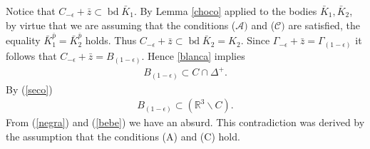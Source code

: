 \documentclass[12pt]{amsart}
\newcommand{\Rt}{\mathbb{R}^3}
\newcommand{\bd}{\operatorname*{bd}}
\begin{document}
Notice that $C_{-\epsilon}+\bar{z}\subset \bd \bar{K}_1$. 
By Lemma \ref{choco} applied to the bodies $\bar{K}_1,\bar{K}_2$, by virtue that we are assuming that the conditions ($\mathcal{A})$ and ($\mathcal{C})$ are satisfied, the equality $\bar{K}^{\bar{p}}_1=\bar{K}^{\bar{p}}_2$ holds. Thus $C_{-\epsilon}+\bar{z}\subset \bd \bar{K}_2=K_2$. Since $\Gamma_{-\epsilon}+\bar{z}=\Gamma_{(1-\epsilon)}$ it follows that $C_{-\epsilon}+\bar{z}=B_{(1-\epsilon)}$. Hence \ref{blanca} implies 
\begin{eqnarray}\label{negra}
B_{(1-\epsilon)}\subset C\cap \Delta^+.
\end{eqnarray}
By (\ref{seco}) 
\begin{eqnarray}\label{bebe}
B_{(1-\epsilon)}\subset (\Rt \backslash C).
\end{eqnarray}
From (\ref{negra}) and (\ref{bebe}) we have an absurd. This contradiction was derived by the assumption that the conditions (A) and (C) hold. 
 
\end{document}
